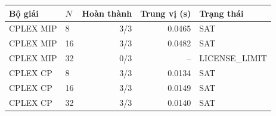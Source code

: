 \begin{tabular}{llrrl}
\toprule
Bộ giải & $N$ & Hoàn thành & Trung vị (s) & Trạng thái \\
\midrule
CPLEX MIP & 8 & 3/3 & 0.0465 & SAT \\
CPLEX MIP & 16 & 3/3 & 0.0482 & SAT \\
CPLEX MIP & 32 & 0/3 & -- & LICENSE\_LIMIT \\
CPLEX CP & 8 & 3/3 & 0.0134 & SAT \\
CPLEX CP & 16 & 3/3 & 0.0149 & SAT \\
CPLEX CP & 32 & 3/3 & 0.0140 & SAT \\
\bottomrule
\end{tabular}
